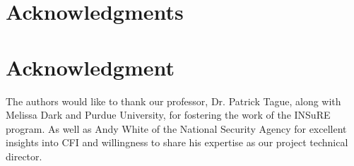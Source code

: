 \documentclass[conference,compsoc]{IEEEtran}
\begin{document}
\ifCLASSOPTIONcompsoc
  \section*{Acknowledgments}
\else
  \section*{Acknowledgment}
\fi


The authors would like to thank our professor, Dr. Patrick Tague, along with Melissa Dark and Purdue University, for fostering the work of the INSuRE program. As well as Andy White of the National Security Agency for excellent insights into CFI and willingness to share his expertise as our project technical director.




\newpage




%






\end{document}
